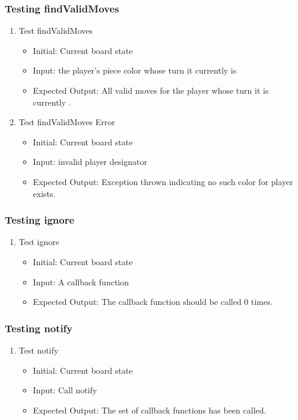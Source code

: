 \documentclass[12pt, titlepage]{article}
\begin{document}
\subsubsection{Testing findValidMoves}
\begin{enumerate}
	\item Test findValidMoves \begin{itemize}
		      \item Initial: Current board state
		      \item Input:  the player's piece color whose turn it currently is
		      \item Expected Output: All valid moves for the player whose turn it is currently .
	      \end{itemize}
	\item Test findValidMoves Error \begin{itemize}
		      \item Initial: Current board state
		      \item Input: invalid player designator
		      \item Expected Output: Exception thrown indicating no such color for player exists.
	      \end{itemize}
\end{enumerate}

\subsubsection{Testing ignore}
\begin{enumerate}
	\item Test ignore \begin{itemize}
		      \item Initial: Current board state
		      \item Input: A callback function
		      \item Expected Output: The callback function should be called 0 times.
	      \end{itemize}
\end{enumerate}

\subsubsection{Testing notify}
\begin{enumerate}
	\item Test notify \begin{itemize}
		      \item Initial: Current board state
		      \item Input: Call notify
		      \item Expected Output: The set of callback functions has been called.
	      \end{itemize}
\end{enumerate}
\end{document}
